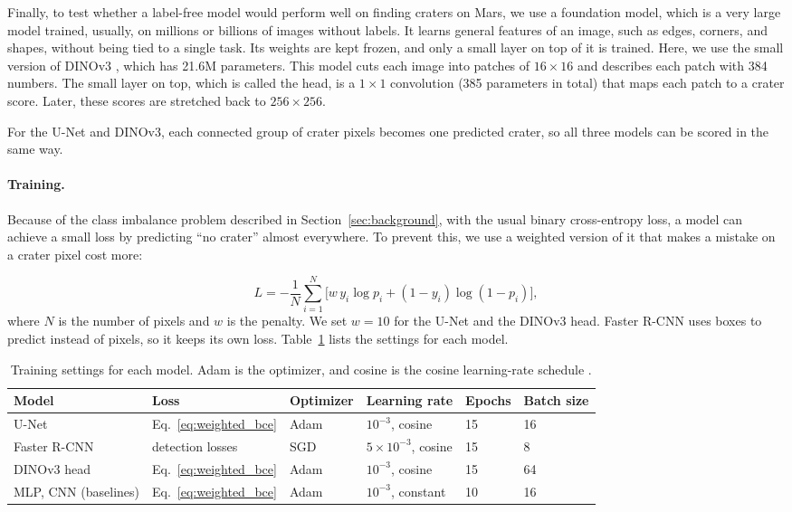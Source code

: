 \documentclass{article} %
\begin{document}
Finally, to test whether a label-free model would perform well on finding craters on Mars, we use a foundation model, which is a very large model trained, usually, on millions or billions of images without labels. It learns general features of an image, such as edges, corners, and shapes, without being tied to a single task. Its weights are kept frozen, and only a small layer on top of it is trained. Here, we use the small version of DINOv3 \cite{simeoni2025}, which has 21.6M parameters. This model cuts each image into patches of $16 \times 16$ and describes each patch with 384 numbers. The small layer on top, which is called the head, is a $1 \times 1$ convolution (385 parameters in total) that maps each patch to a crater score. Later, these scores are stretched back to $256 \times 256$.

For the U-Net and DINOv3, each connected group of crater pixels becomes one predicted crater, so all three models can be scored in the same way.

\paragraph{Training.}
Because of the class imbalance problem described in Section~\ref{sec:background}, with the usual binary  cross-entropy loss, a model can achieve a small loss by predicting ``no crater'' almost everywhere. To prevent this, we use a weighted version of it that makes a mistake on a crater pixel cost more:


\begin{equation}
L = -\frac{1}{N} \sum_{i=1}^{N} \Big[ w \, y_i \log p_i + (1 - y_i) \log (1 - p_i) \Big],
\label{eq:weighted_bce}
\end{equation}
where $N$ is the number of pixels and $w$ is the penalty. We set $w = 10$ for the U-Net and the DINOv3 head. Faster R-CNN uses boxes to predict instead of pixels, so it keeps its own loss.  
Table~\ref{tab:training} lists the settings for each model.

\begin{table}[t]
  \centering
  \begin{tabular}{llllll}
    \toprule
    Model & Loss & Optimizer & Learning rate & Epochs & Batch size \\
    \midrule
    U-Net & Eq.~\ref{eq:weighted_bce} & Adam & $10^{-3}$, cosine & 15 & 16 \\
    Faster R-CNN & detection losses & SGD & $5 \times 10^{-3}$, cosine & 15 & 8 \\
    DINOv3 head & Eq.~\ref{eq:weighted_bce} & Adam & $10^{-3}$, cosine & 15 & 64 \\
    MLP, CNN (baselines) & Eq.~\ref{eq:weighted_bce} & Adam & $10^{-3}$, constant & 10 & 16 \\
    \bottomrule
  \end{tabular}
  \caption{Training settings for each model. Adam \cite{kingma2014} is the optimizer, and cosine is the cosine learning-rate schedule \cite{loshchilov2016}.}
  \label{tab:training}
\end{table}
\end{document}
